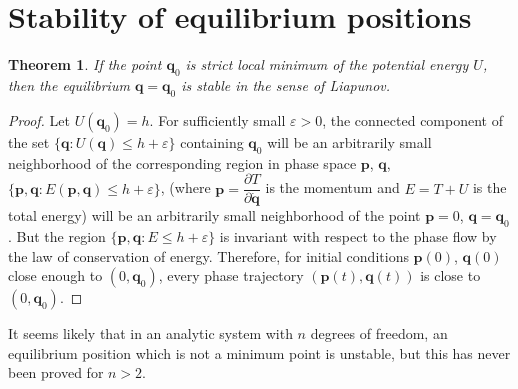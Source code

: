 \documentclass[conference]{IEEEtran}
\newtheorem{theorem}{Theorem}[section]
\theoremstyle{definition}
\theoremstyle{remark}
\begin{document}
    \section{Stability of equilibrium positions}
    \begin{theorem}
        If the point $\mathbf{q}_0$ is strict local minimum of the potential energy $U$, then the equilibrium $\mathbf{q} = \mathbf{q}_0$ is stable in the sense of Liapunov.
    \end{theorem}
    \begin{proof}
        Let $U(\mathbf{q}_0) = h$. For sufficiently small $\varepsilon > 0$, the connected component of the set $\{ \mathbf{q}:U(\mathbf{q}) \leq h + \varepsilon \}$ containing $\mathbf{q}_0$ will be an arbitrarily small neighborhood of the corresponding region in phase space $\mathbf{p}$, $\mathbf{q}$, $\{ \mathbf{p}, \mathbf{q}: E(\mathbf{p}, \mathbf{q}) \leq h + \varepsilon \}$, (where $\mathbf{p} = \dfrac{\partial T}{\partial \dot{\mathbf{q}}}$ is the momentum and $E = T + U$ is the total energy) will be an arbitrarily small neighborhood of the point $\mathbf{p} = 0$, $\mathbf{q} = \mathbf{q}_0$. But the region $\{\mathbf{p}, \mathbf{q}: E \leq h + \varepsilon\}$ is invariant with respect to the phase flow by the law of conservation of energy. Therefore, for initial conditions $\mathbf{p}(0)$, $\mathbf{q}(0)$ close enough to $(0, \mathbf{q}_0)$, every phase trajectory $(\mathbf{p}(t), \mathbf{q}(t))$ is close to $(0, \mathbf{q}_0)$.
    \end{proof}

    It seems likely that in an analytic system with $n$ degrees of freedom, an equilibrium position which is not a minimum point is unstable, but this has never been proved for $n>2$.
\end{document}
